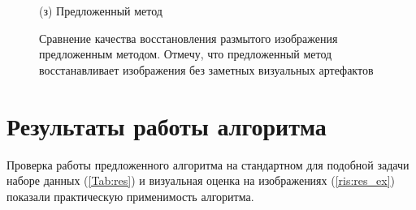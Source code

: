\begin{figure}[H]
\begin{minipage}[t]{0.22\linewidth}
(з) Предложенный метод\\
\end{minipage}

\caption{Сравнение качества восстановления размытого изображения предложенным методом. Отмечу, что предложенный метод восстанавливает изображения без заметных визуальных артефактов}
\label{ris:restore_example_big}
\end{figure}

\newpage
\section{Результаты работы алгоритма}

Проверка работы предложенного алгоритма на стандартном для подобной задачи наборе данных (\ref{Tab:res}) и визуальная оценка на изображениях (\ref{ris:res_ex}) показали практическую применимость алгоритма.

